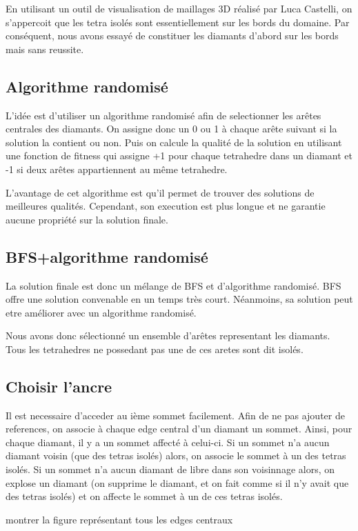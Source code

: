 \documentclass[a4paper,11pt,openany]{article}
\begin{document}
En utilisant un outil de visualisation de maillages 3D réalisé par Luca Castelli, on s'appercoit que les tetra isolés sont essentiellement sur les bords du domaine. Par conséquent, nous avons essayé de constituer les diamants d'abord sur les bords mais sans reussite.
 
\subsection{Algorithme randomisé}
L'idée est d'utiliser un algorithme randomisé afin de selectionner les arêtes centrales des diamants. On assigne donc un 0 ou 1 à chaque arête suivant si la solution la contient ou non. Puis on calcule la qualité de la solution en utilisant une fonction de fitness qui assigne +1 pour chaque tetrahedre dans un diamant et -1 si deux arêtes appartiennent au même tetrahedre.

L'avantage de cet algorithme est qu'il permet de trouver des solutions de meilleures qualités. Cependant, son execution est plus longue et ne garantie aucune propriété sur la solution finale.

\subsection{BFS+algorithme randomisé}
La solution finale est donc un mélange de BFS et d'algorithme randomisé. BFS offre une solution convenable en un temps très court. Néanmoins, sa solution peut etre améliorer avec un algorithme randomisé.


Nous avons donc sélectionné un ensemble d'arêtes representant les diamants. Tous les tetrahedres ne possedant pas une de ces aretes sont dit isolés.
\subsection{Choisir l'ancre}
Il est necessaire d'acceder au ième sommet facilement. Afin de ne pas ajouter de references, on associe à chaque edge central d'un diamant un sommet. Ainsi, pour chaque diamant, il y a un sommet affecté à celui-ci.
Si un sommet n'a aucun diamant voisin (que des tetras isolés) alors, on associe le sommet à un des tetras isolés.
Si un sommet n'a aucun diamant de libre dans son voisinnage alors, on explose un diamant (on supprime le diamant, et on fait comme si il n'y avait que des tetras isolés) et on affecte le sommet à un de ces tetras isolés.

montrer la figure représentant tous les edges centraux
\end{document}
